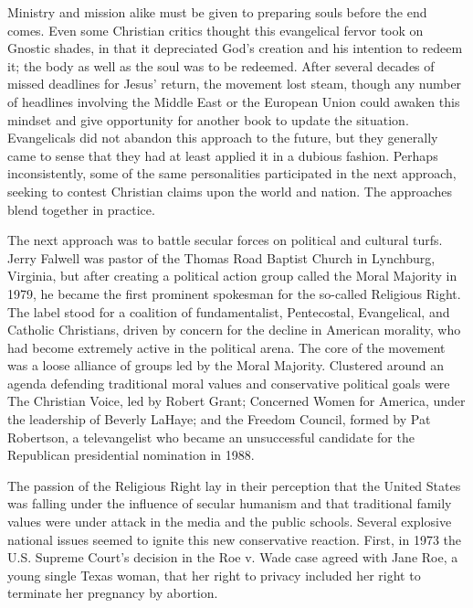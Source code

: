Ministry and mission alike must be given to preparing souls before the end comes. Even some
Christian critics thought this evangelical fervor took on Gnostic shades, in that it depreciated
God’s creation and his intention to redeem it; the body as well as the soul was to be redeemed.
After several decades of missed deadlines for Jesus’ return, the movement lost steam, though any
number of headlines involving the Middle East or the European Union could awaken this mindset and
give opportunity for another book to update the situation. Evangelicals did not abandon this
approach to the future, but they generally came to sense that they had at least applied it in a
dubious fashion. Perhaps inconsistently, some of the same personalities participated in the next
approach, seeking to contest Christian claims upon the world and nation. The approaches blend
together in practice.

The next approach was to battle secular forces on political and cultural turfs. Jerry Falwell was
pastor of the Thomas Road Baptist Church in Lynchburg, Virginia, but after creating a political
action group called the Moral Majority in 1979, he became the first prominent spokesman for the
so-called Religious Right. The label stood for a coalition of fundamentalist, Pentecostal,
Evangelical, and Catholic Christians, driven by concern for the decline in American morality, who
had become extremely active in the political arena. The core of the movement was a loose alliance of
groups led by the Moral Majority. Clustered around an agenda defending traditional moral values and
conservative political goals were The Christian Voice, led by Robert Grant; Concerned Women for
America, under the leadership of Beverly LaHaye; and the Freedom Council, formed by Pat Robertson, a
televangelist who became an unsuccessful candidate for the Republican presidential nomination in
1988.

The passion of the Religious Right lay in their perception that the United States was falling under
the influence of secular humanism and that traditional family values were under attack in the media
and the public schools. Several explosive national issues seemed to ignite this new conservative
reaction. First, in 1973 the U.S. Supreme Court’s decision in the Roe v. Wade case agreed with Jane
Roe, a young single Texas woman, that her right to privacy included her right to terminate her
pregnancy by abortion.


